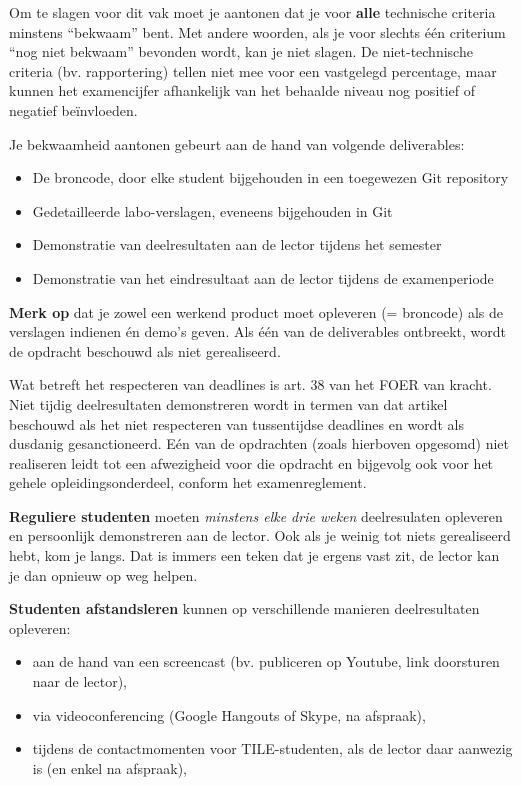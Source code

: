 Om te slagen voor dit vak moet je aantonen dat je voor \textbf{alle} technische criteria minstens ``bekwaam'' bent. Met andere woorden, als je voor slechts één criterium ``nog niet bekwaam'' bevonden wordt, kan je niet slagen. De niet-technische criteria (bv. rapportering) tellen niet mee voor een vastgelegd percentage, maar kunnen het examencijfer afhankelijk van het behaalde niveau nog positief of negatief beïnvloeden.

Je bekwaamheid aantonen gebeurt aan de hand van volgende deliverables:

\begin{itemize}
  \item De broncode, door elke student bijgehouden in een toegewezen Git repository
  \item Gedetailleerde labo-verslagen, eveneens bijgehouden in Git
  \item Demonstratie van deelresultaten aan de lector tijdens het semester
  \item Demonstratie van het eindresultaat aan de lector tijdens de examenperiode
\end{itemize}

\textbf{Merk op} dat je zowel een werkend product moet opleveren (= broncode) als de verslagen indienen én demo's geven. Als één van de deliverables ontbreekt, wordt de opdracht beschouwd als niet gerealiseerd.

Wat betreft het respecteren van deadlines is art. 38 van het FOER van kracht. Niet tijdig deelresultaten demonstreren wordt in termen van dat artikel beschouwd als het niet respecteren van tussentijdse deadlines en wordt als dusdanig gesanctioneerd. Eén van de opdrachten (zoals hierboven opgesomd) niet realiseren leidt tot een afwezigheid voor die opdracht en bijgevolg ook voor het gehele opleidingsonderdeel, conform het examenreglement.

\textbf{Reguliere studenten} moeten \emph{minstens elke drie weken} deelresulaten opleveren en persoonlijk demonstreren aan de lector. Ook als je weinig tot niets gerealiseerd hebt, kom je langs. Dat is immers een teken dat je ergens vast zit, de lector kan je dan opnieuw op weg helpen.

\textbf{Studenten afstandsleren} kunnen op verschillende manieren deelresultaten opleveren:

\begin{itemize}
  \item aan de hand van een screencast (bv. publiceren op Youtube, link doorsturen naar de lector),
  \item via videoconferencing (Google Hangouts of Skype, na afspraak),
  \item tijdens de contactmomenten voor TILE-studenten, als de lector daar aanwezig is (en enkel na afspraak),
\end{itemize}

